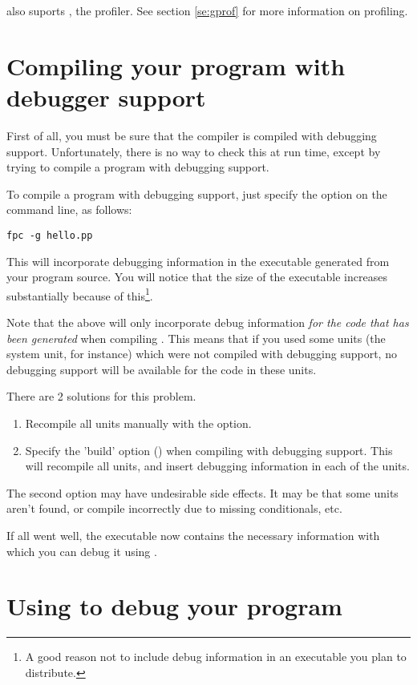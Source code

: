 \fpc also suports , the \gnu profiler. See section \ref{se:gprof}
for more information on profiling.

\section{Compiling your program with debugger support}
First of all, you must be sure that the compiler is compiled with debugging
support. Unfortunately, there is no way to check this at run time, except by
trying to compile a program with debugging support.

To compile a program with debugging support, just specify the 
option on the command line, as follows:
\begin{verbatim}
fpc -g hello.pp
\end{verbatim}
This will incorporate debugging information in the executable generated 
from your program source. You will notice that the size of the executable 
increases substantially because of this\footnote{A good reason not to include debug
information in an executable you plan to distribute.}.

Note that the above will only incorporate debug information {\em for the code
that has been generated} when compiling . This means that if
you used some units (the system unit, for instance) which were not compiled
with debugging support, no debugging support will be available for the code
in these units.

There are 2 solutions for this problem.
\begin{enumerate}
\item Recompile all units manually with the  option.
\item Specify the 'build' option () when compiling with debugging
support. This will recompile all units, and insert debugging information in
each of the units.
\end{enumerate}
The second option may have undesirable side effects. It may be that some
units aren't found, or compile incorrectly due to missing conditionals,
etc.

If all went well, the executable now contains the necessary information with
which you can debug it using \gnu {}.


\section{Using  to debug your program}
\label{se:usinggdb}

